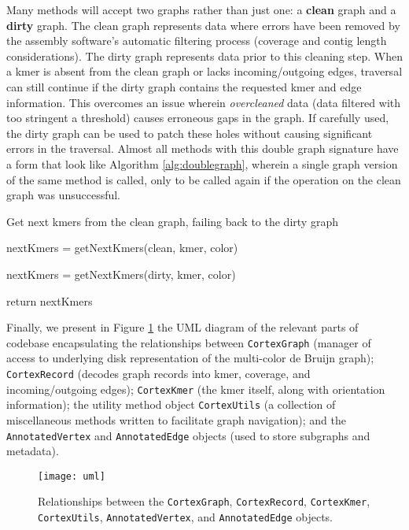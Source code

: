 Many methods will accept two graphs rather than just one: a \textbf{clean} graph and a \textbf{dirty} graph.  The clean graph represents data where errors have been removed by the assembly software's automatic filtering process (coverage and contig length considerations).  The dirty graph represents data prior to this cleaning step.  When a kmer is absent from the clean graph or lacks incoming/outgoing edges, traversal can still continue if the dirty graph contains the requested kmer and edge information.  This overcomes an issue wherein \textit{overcleaned} data (data filtered with too stringent a threshold) causes erroneous gaps in the graph.  If carefully used, the dirty graph can be used to patch these holes without causing significant errors in the traversal.  Almost all methods with this double graph signature have a form that look like Algorithm \ref{alg:doublegraph}, wherein a single graph version of the same method is called, only to be called again if the operation on the clean graph was unsuccessful. 

\begin{algorithm}
\caption{Get next kmers from the clean graph, failing back to the dirty graph}
\label{alg:doublegraph}
\begin{algorithmic}[1]
    \State nextKmers = getNextKmers(clean, kmer, color)

        \State nextKmers = getNextKmers(dirty, kmer, color)
    \EndIf

    \State return nextKmers
\EndFunction
\end{algorithmic}
\end{algorithm}

Finally, we present in Figure \ref{fig:uml} the UML diagram of the relevant parts of codebase encapsulating the relationships between \texttt{CortexGraph} (manager of access to underlying disk representation of the multi-color de Bruijn graph); \texttt{CortexRecord} (decodes graph records into kmer, coverage, and incoming/outgoing edges); \texttt{CortexKmer} (the kmer itself, along with orientation information); the utility method object \texttt{CortexUtils} (a collection of miscellaneous methods written to facilitate graph navigation); and the \texttt{AnnotatedVertex} and \texttt{AnnotatedEdge} objects (used to store subgraphs and metadata).

\begin{figure}[h!]
  \centering
    \texttt{[image: uml]}
  \caption{Relationships between the \texttt{CortexGraph}, \texttt{CortexRecord}, \texttt{CortexKmer}, \texttt{CortexUtils}, \texttt{AnnotatedVertex}, and \texttt{AnnotatedEdge} objects.}
  \label{fig:uml}
\end{figure}

